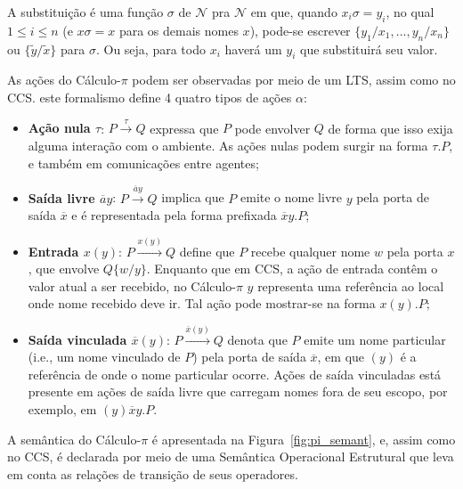 A substituição é uma função $\sigma$ de $\mathcal{N}$ pra $\mathcal{N}$ em que, quando $x_{i}\sigma = y_{i}$, no qual $1\leq i \leq n$ (e $x\sigma = x$ para os demais nomes $x$), pode-se escrever $\{y_{1}/x_{1}, ..., y_{n}/x_{n}\}$ ou $\{\tilde{y}/\tilde{x}\}$ para $\sigma$. Ou seja, para todo $x_{i}$ haverá um $y_{i}$ que substituirá seu valor.

As ações do Cálculo-$\pi$ podem ser observadas por meio de um LTS, assim como no CCS. este formalismo define 4 quatro tipos de ações $\alpha$:
\begin{itemize}
	\item \textbf{Ação nula $\tau$}: $P \stackrel{\tau}{\longrightarrow} Q$ expressa que $P$ pode envolver $Q$ de forma que isso exija alguma interação com o ambiente. As ações nulas podem surgir na forma $\tau.P$, e também em comunicações entre agentes;
	\item \textbf{Saída livre $\overline{a}y$}: $P \stackrel{\overline{a}y}{\longrightarrow} Q$ implica que $P$ emite o nome livre $y$ pela porta de saída $\overline{x}$ e é representada pela forma prefixada $\overline{x}y.P$;
	\item \textbf{Entrada $x(y)$}: $P \stackrel{x(y)}{\longrightarrow} Q$ define que $P$ recebe qualquer nome $w$ pela porta $x$, que envolve $Q\{w/y\}$. Enquanto que em CCS, a ação de entrada contêm o valor atual a ser recebido, no Cálculo-$\pi$ $y$ representa uma referência ao local onde nome recebido deve ir. Tal ação pode mostrar-se na forma $x(y).P$;
	\item \textbf{Saída vinculada $\overline{x}(y)$}: $P \stackrel{\overline{x}(y)}{\longrightarrow} Q$ denota que $P$ emite um nome particular (i.e., um nome vinculado de $P$) pela porta de saída $\overline{x}$, em que $(y)$ é a referência de onde o nome particular ocorre. Ações de saída vinculadas está presente em ações de saída livre que carregam nomes fora de seu escopo, por exemplo, em $(y)\overline{x}y.P$.
\end{itemize}

A semântica do Cálculo-$\pi$ é apresentada na Figura~\ref{fig:pi_semant}, e, assim como no CCS, é declarada por meio de uma Semântica Operacional Estrutural que leva em conta as relações de transição de seus operadores.

